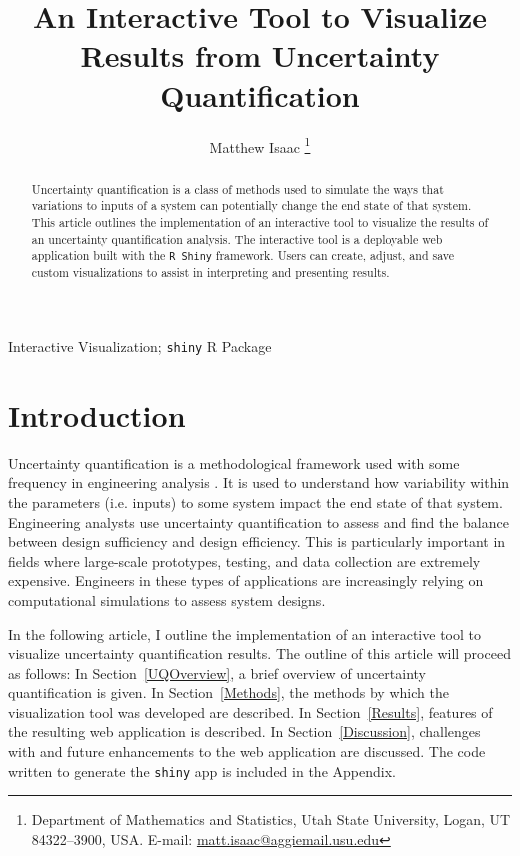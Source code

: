 \documentclass[11pt]{asaproc}\usepackage[]{graphicx}\usepackage[]{color}
\title{An Interactive Tool to Visualize Results from Uncertainty Quantification}
\author{Matthew Isaac \thanks{Department of Mathematics and Statistics, Utah State University, Logan, UT 84322--3900, USA. 
E-mail: \url{matt.isaac@aggiemail.usu.edu}}
}
\begin{document}
\renewcommand{\topfraction}{1.0}
\renewcommand{\bottomfraction}{1.0}
\renewcommand{\textfraction}{0.0}
\renewcommand{\floatpagefraction}{1.0}
\renewcommand{\dbltopfraction}{1.0}


\maketitle

\begin{abstract}
Uncertainty quantification is a class of methods used to simulate the ways that variations to inputs of a system can potentially change the end state of that system. This article outlines the implementation of an interactive tool to visualize the results of an uncertainty quantification analysis. The interactive tool is a deployable web application built with the {\tt R Shiny} framework. Users can create, adjust, and save custom visualizations to assist in interpreting and presenting results. 
\end{abstract}

\begin{keywords} Interactive Visualization; {\tt shiny} R Package
\end{keywords}


\section{Introduction}
\label{Introduction}

Uncertainty quantification is a methodological framework used with some frequency in engineering analysis \citep{EW2018}. It is used to understand how variability  within the parameters (i.e. inputs) to some system impact the end state of that system. Engineering analysts use uncertainty quantification to assess and find the balance between design sufficiency and design efficiency. This is particularly important in fields where large-scale prototypes, testing, and data collection are extremely expensive. Engineers in these types of applications are increasingly relying on computational simulations to assess system designs.

In the following article, I outline the implementation of an interactive tool to visualize uncertainty quantification results. The outline of this article will proceed as follows: In Section~\ref{UQOverview}, a brief overview of uncertainty quantification is given. In Section~\ref{Methods}, the methods by which the visualization tool was developed are described. In Section~\ref{Results}, features of the resulting web application is described. In Section~\ref{Discussion}, challenges with and future enhancements to the web application are discussed. The code written to generate the {\tt shiny} app is included in the Appendix.
\end{document}
